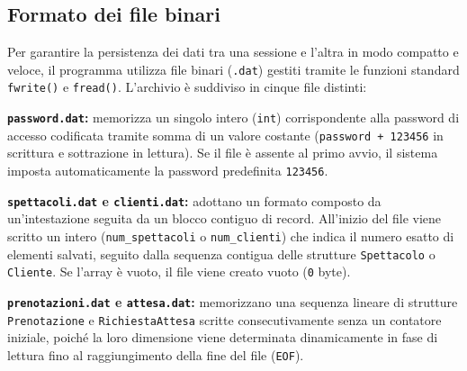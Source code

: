 \documentclass[11pt,a4paper,oneside,openany]{book}
\newenvironment{listacomp}{%
    \small
    \begin{list}{\textendash}{%
        \setlength{\topsep}{2pt}%
        \setlength{\partopsep}{0pt}%
        \setlength{\itemsep}{1pt}%
        \setlength{\parsep}{0pt}%
        \setlength{\leftmargin}{1.2em}%
    }%
}{%
    \end{list}%
}
\begin{document}
\subsection{Formato dei file binari}
Per garantire la persistenza dei dati tra una sessione e l'altra in modo compatto e veloce, il programma utilizza file binari (\texttt{.dat}) gestiti tramite le funzioni standard \texttt{fwrite()} e \texttt{fread()}. L'archivio è suddiviso in cinque file distinti:
\begin{listacomp}
    \item \textbf{\texttt{password.dat}:} memorizza un singolo intero (\texttt{int}) corrispondente alla password di accesso codificata tramite somma di un valore costante (\texttt{password + 123456} in scrittura e sottrazione in lettura). Se il file è assente al primo avvio, il sistema imposta automaticamente la password predefinita \texttt{123456}.
    \item \textbf{\texttt{spettacoli.dat} e \texttt{clienti.dat}:} adottano un formato composto da un'intestazione seguita da un blocco contiguo di record. All'inizio del file viene scritto un intero (\texttt{num\_spettacoli} o \texttt{num\_clienti}) che indica il numero esatto di elementi salvati, seguito dalla sequenza contigua delle strutture \texttt{Spettacolo} o \texttt{Cliente}. Se l'array è vuoto, il file viene creato vuoto (\texttt{0} byte).
    \item \textbf{\texttt{prenotazioni.dat} e \texttt{attesa.dat}:} memorizzano una sequenza lineare di strutture \texttt{Prenotazione} e \texttt{RichiestaAttesa} scritte consecutivamente senza un contatore iniziale, poiché la loro dimensione viene determinata dinamicamente in fase di lettura fino al raggiungimento della fine del file (\texttt{EOF}).
\end{listacomp}
\end{document}
